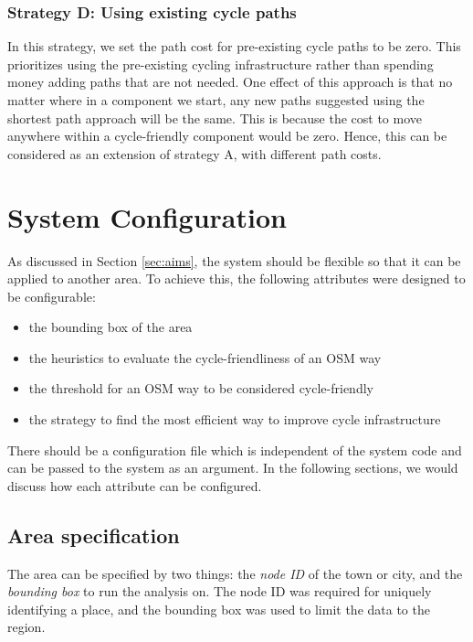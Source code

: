 \documentclass[12pt,a4paper]{report}
\begin{document}
\subsubsection*{Strategy D: Using existing cycle paths}
In this strategy, we set the path cost for pre-existing cycle paths to be zero. This prioritizes using the pre-existing cycling infrastructure rather than spending money adding paths that are not needed. One effect of this approach is that no matter where in a component we start, any new paths suggested using the shortest path approach will be the same. This is because the cost to move anywhere within a cycle-friendly component would be zero. Hence, this can be considered as an extension of strategy A, with different path costs.

\section{System Configuration}\label{sec:config}
As discussed in Section \ref{sec:aims}, the system should be flexible so that it can be applied to another area. To achieve this, the following attributes were designed to be configurable:

\begin{itemize}
    \item the bounding box of the area
    \item the heuristics to evaluate the cycle-friendliness of an OSM way
    \item the threshold for an OSM way to be considered cycle-friendly
    \item the strategy to find the most efficient way to improve cycle infrastructure
\end{itemize}

There should be a configuration file which is independent of the system code and can be passed to the system as an argument. In the following sections, we would discuss how each attribute can be configured.

\subsection{Area specification}
The area can be specified by two things: the \textit{node ID} of the town or city, and the \textit{bounding box} to run the analysis on. The node ID was required for uniquely identifying a place, and the bounding box was used to limit the data to the region.
\end{document}
